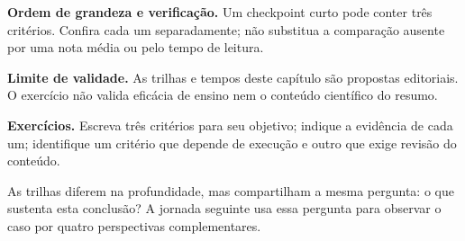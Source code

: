\begin{resultado}
\textbf{Ordem de grandeza e verificação.} Um checkpoint curto pode conter três critérios. Confira cada um separadamente; não substitua a comparação ausente por uma nota média ou pelo tempo de leitura.
\end{resultado}
\begin{aviso}
\textbf{Limite de validade.} As trilhas e tempos deste capítulo são propostas editoriais. O exercício não valida eficácia de ensino nem o conteúdo científico do resumo.
\end{aviso}
\begin{resultado}
\textbf{Exercícios.} Escreva três critérios para seu objetivo; indique a evidência de cada um; identifique um critério que depende de execução e outro que exige revisão do conteúdo.
\end{resultado}

As trilhas diferem na profundidade, mas compartilham a mesma pergunta: o que sustenta esta conclusão? A jornada seguinte usa essa pergunta para observar o caso por quatro perspectivas complementares.
